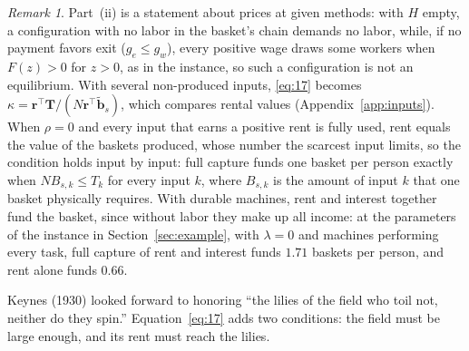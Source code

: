 \documentclass[12pt]{article}
\theoremstyle{plain}
\theoremstyle{definition}
\theoremstyle{remark}
\newtheorem*{remark}{Remark}
\begin{document}
\begin{remark}
Part~(ii) is a statement about prices at given methods: with $H$ empty, a configuration with no labor in the basket's chain demands no labor, while, if no payment favors exit ($g_e\le g_w$), every positive wage draws some workers when $F(z)>0$ for $z>0$, as in the instance, so such a configuration is not an equilibrium. With several non-produced inputs, \eqref{eq:17} becomes $\kappa=\mathbf r^{\top}\mathbf T/(N\mathbf r^{\top}\widetilde{\mathbf b}_s)$, which compares rental values (Appendix~\ref{app:inputs}). When $\rho=0$ and every input that earns a positive rent is fully used, rent equals the value of the baskets produced, whose number the scarcest input limits, so the condition holds input by input: full capture funds one basket per person exactly when $NB_{s,k}\le T_k$ for every input $k$, where $B_{s,k}$ is the amount of input $k$ that one basket physically requires. With durable machines, rent and interest together fund the basket, since without labor they make up all income: at the parameters of the instance in Section~\ref{sec:example}, with $\lambda=0$ and machines performing every task, full capture of rent and interest funds $1.71$ baskets per person, and rent alone funds $0.66$.
\end{remark}

Keynes (1930) looked forward to honoring ``the lilies of the field who toil not, neither do they spin.'' Equation~\eqref{eq:17} adds two conditions: the field must be large enough, and its rent must reach the lilies.
\end{document}
